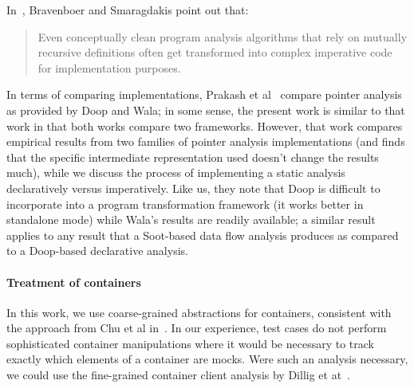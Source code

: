 In~\cite{bravenboer09:_stric_declar_specif_sophis_point_analy}, Bravenboer and Smaragdakis point out that:
\begin{quote}
Even conceptually clean program analysis algorithms that
rely on mutually recursive definitions often get transformed
into complex imperative code for implementation purposes.
\end{quote}



In terms of comparing implementations, Prakash et al~\cite{prakash21:_effec_progr_repres_point_analy} compare pointer analysis as provided by Doop and Wala; in some sense, the present work is similar to that work in that both works compare two frameworks. However, that work compares empirical results from two families of pointer analysis implementations (and finds that the specific intermediate representation used doesn't change the results much), while we discuss the process of implementing a static analysis declaratively versus imperatively. Like us, they note that Doop is difficult to incorporate into a program transformation framework (it works better in standalone mode) while Wala's results are readily available; a similar result applies to any result that a Soot-based data flow analysis produces as compared to a Doop-based declarative analysis.

\paragraph{Treatment of containers} In this work, we use coarse-grained abstractions for containers, consistent with the approach from Chu et al in~\cite{chu12:_collec_disjoin_analy}. In our experience, test cases do not perform sophisticated container manipulations where it would be necessary to track exactly which elements of a container are mocks. Were such an analysis necessary, we could use the fine-grained container client analysis by Dillig et at~\cite{dillig11:_precis_reason_progr_using_contain}.

